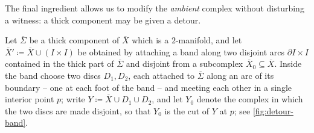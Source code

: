 \documentclass[reqno]{amsart}
\theoremstyle{definition}
\renewcommand{\bar}{\overline}
\numberwithin{equation}{section}
\begin{document}
The final ingredient allows us to modify the \emph{ambient}
complex without disturbing a witness: a thick component may be
given a detour.

Let \(\bar\Sigma\) be a thick component of \(\bar X\) which is
a \(2\)-manifold, and let
\(\bar X'\coloneqq\bar X\cup(I\times I)\) be obtained by
attaching a band along two disjoint arcs
\(\partial I\times I\) contained in the thick part of
\(\bar\Sigma\) and disjoint from a subcomplex
\(\bar X_0\subseteq\bar X\).
Inside the band choose two discs
\(D_1,D_2\), each attached to \(\bar\Sigma\) along an arc of
its boundary -- one at each foot of the band -- and meeting
each other in a single interior point \(p\); write
\(Y\coloneqq\bar X\cup D_1\cup D_2\), and let \(Y_0\) denote
the complex in which the two discs are made disjoint, so that
\(Y_0\) is the cut of \(Y\) at \(p\); see \cref{fig:detour-band}.
\end{document}
